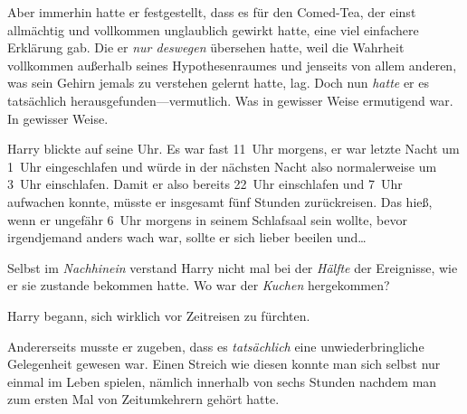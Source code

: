 Aber immerhin hatte er festgestellt, dass es für den Comed-Tea, der einst allmächtig und vollkommen unglaublich gewirkt hatte, eine viel einfachere Erklärung gab. Die er \emph{nur deswegen} übersehen hatte, weil die Wahrheit vollkommen außerhalb seines Hypothesenraumes und jenseits von allem anderen, was sein Gehirn jemals zu verstehen gelernt hatte, lag. Doch nun \emph{hatte} er es tatsächlich herausgefunden—vermutlich. Was in gewisser Weise ermutigend war. In gewisser Weise.

Harry blickte auf seine Uhr. Es war fast 11~Uhr morgens, er war letzte Nacht um 1~Uhr eingeschlafen und würde in der nächsten Nacht also normalerweise um 3~Uhr einschlafen. Damit er also bereits 22~Uhr einschlafen und 7~Uhr aufwachen konnte, müsste er insgesamt fünf Stunden zurückreisen. Das hieß, wenn er ungefähr 6~Uhr morgens in seinem Schlafsaal sein wollte, bevor irgendjemand anders wach war, sollte er sich lieber beeilen und…

Selbst im \emph{Nachhinein} verstand Harry nicht mal bei der \emph{Hälfte} der Ereignisse, wie er sie zustande bekommen hatte. Wo war der \emph{Kuchen} hergekommen?

Harry begann, sich wirklich vor Zeitreisen zu fürchten.

Andererseits musste er zugeben, dass es \emph{tatsächlich} eine unwiederbringliche Gelegenheit gewesen war. Einen Streich wie diesen konnte man sich selbst nur einmal im Leben spielen, nämlich innerhalb von sechs Stunden nachdem man zum ersten Mal von Zeitumkehrern gehört hatte.

